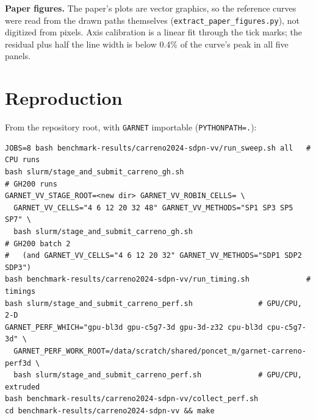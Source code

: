 \documentclass[a4paper,10pt]{article}
\newcommand{\garnet}{\texttt{GARNET}}
\newcommand{\code}[1]{\texttt{#1}}
\begin{document}
\textbf{Paper figures.} The paper's plots are vector graphics, so the
reference curves were read from the drawn paths themselves
(\code{extract\_paper\_figures.py}), not digitized from pixels. Axis
calibration is a linear fit through the tick marks; the residual plus half
the line width is below 0.4\% of the curve's peak in all five panels.





\clearpage


\clearpage




\appendix
\section{Reproduction}

From the repository root, with \garnet{} importable (\code{PYTHONPATH=.}):

\begin{verbatim}
JOBS=8 bash benchmark-results/carreno2024-sdpn-vv/run_sweep.sh all   # CPU runs
bash slurm/stage_and_submit_carreno_gh.sh                             # GH200 runs
GARNET_VV_STAGE_ROOT=<new dir> GARNET_VV_ROBIN_CELLS= \
  GARNET_VV_CELLS="4 6 12 20 32 48" GARNET_VV_METHODS="SP1 SP3 SP5 SP7" \
  bash slurm/stage_and_submit_carreno_gh.sh                           # GH200 batch 2
#   (and GARNET_VV_CELLS="4 6 12 20 32" GARNET_VV_METHODS="SDP1 SDP2 SDP3")
bash benchmark-results/carreno2024-sdpn-vv/run_timing.sh             # timings
bash slurm/stage_and_submit_carreno_perf.sh               # GPU/CPU, 2-D
GARNET_PERF_WHICH="gpu-bl3d gpu-c5g7-3d gpu-3d-z32 cpu-bl3d cpu-c5g7-3d" \
  GARNET_PERF_WORK_ROOT=/data/scratch/shared/poncet_m/garnet-carreno-perf3d \
  bash slurm/stage_and_submit_carreno_perf.sh             # GPU/CPU, extruded
bash benchmark-results/carreno2024-sdpn-vv/collect_perf.sh
cd benchmark-results/carreno2024-sdpn-vv && make
\end{verbatim}
\end{document}
